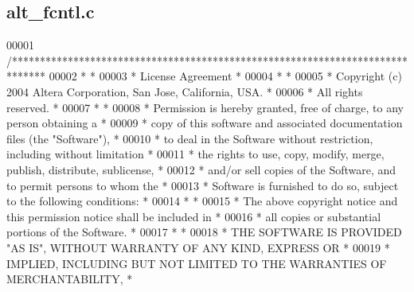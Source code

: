 \subsection{alt\+\_\+fcntl.\+c}
\label{alt__fcntl_8c_source}

\begin{DoxyCode}
00001 \textcolor{comment}{/******************************************************************************}
00002 \textcolor{comment}{*                                                                             *}
00003 \textcolor{comment}{* License Agreement                                                           *}
00004 \textcolor{comment}{*                                                                             *}
00005 \textcolor{comment}{* Copyright (c) 2004 Altera Corporation, San Jose, California, USA.           *}
00006 \textcolor{comment}{* All rights reserved.                                                        *}
00007 \textcolor{comment}{*                                                                             *}
00008 \textcolor{comment}{* Permission is hereby granted, free of charge, to any person obtaining a     *}
00009 \textcolor{comment}{* copy of this software and associated documentation files (the "Software"),  *}
00010 \textcolor{comment}{* to deal in the Software without restriction, including without limitation   *}
00011 \textcolor{comment}{* the rights to use, copy, modify, merge, publish, distribute, sublicense,    *}
00012 \textcolor{comment}{* and/or sell copies of the Software, and to permit persons to whom the       *}
00013 \textcolor{comment}{* Software is furnished to do so, subject to the following conditions:        *}
00014 \textcolor{comment}{*                                                                             *}
00015 \textcolor{comment}{* The above copyright notice and this permission notice shall be included in  *}
00016 \textcolor{comment}{* all copies or substantial portions of the Software.                         *}
00017 \textcolor{comment}{*                                                                             *}
00018 \textcolor{comment}{* THE SOFTWARE IS PROVIDED "AS IS", WITHOUT WARRANTY OF ANY KIND, EXPRESS OR  *}
00019 \textcolor{comment}{* IMPLIED, INCLUDING BUT NOT LIMITED TO THE WARRANTIES OF MERCHANTABILITY,    *}

\end{DoxyCode}
